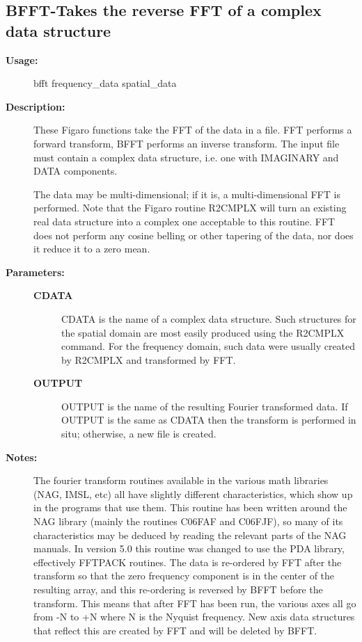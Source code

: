 \subsection{BFFT-\label{BFFT}Takes the reverse FFT of a complex data structure}
\begin{description}

\item [\textbf{Usage:}]
 bfft frequency\_data spatial\_data

\item [\textbf{Description:}]
 These Figaro functions take the FFT of the data in a file.
 FFT performs a forward transform, BFFT performs an inverse
 transform.  The input file must contain a complex data
 structure, i.e. one with IMAGINARY and DATA components.

 The data may be multi-dimensional; if it is, a multi-dimensional
 FFT is performed.  Note that the Figaro routine R2CMPLX will turn
 an existing real data structure into a complex one acceptable to
 this routine. FFT does not perform any cosine belling or other
 tapering of the data, nor does it reduce it to a zero mean.

\item [\textbf{Parameters:}]
\begin{description}
\item [\textbf{CDATA}]
 CDATA is the name of a complex data structure. Such structures
 for the spatial domain are most easily produced using the
 R2CMPLX command. For the frequency domain, such data were
 usually created by R2CMPLX and transformed by FFT.
\item [\textbf{OUTPUT}]
 OUTPUT is the name of the resulting Fourier transformed data.
 If OUTPUT is the same as CDATA then the transform is performed
 in situ; otherwise, a new file is created.
\end{description}

\item [\textbf{Notes:}]
 The fourier transform routines available in the various math
 libraries (NAG, IMSL, etc) all have slightly different
 characteristics, which show up in the programs that use them.
 This routine has been written around the NAG library (mainly
 the routines C06FAF and C06FJF), so many of its characteristics
 may be deduced by reading the relevant parts of the NAG manuals.
 In version 5.0 this routine was changed to use the PDA library,
 effectively FFTPACK routines. The data is re-ordered by FFT after
 the transform so that the zero frequency component is in the
 center of the resulting array, and this re-ordering is reversed by
 BFFT before the transform. This means that after FFT has been run,
 the various axes all go from -N to +N where N is the Nyquist
 frequency.  New axis data structures that reflect this are created
 by FFT and will be deleted by BFFT.


\end{description}
